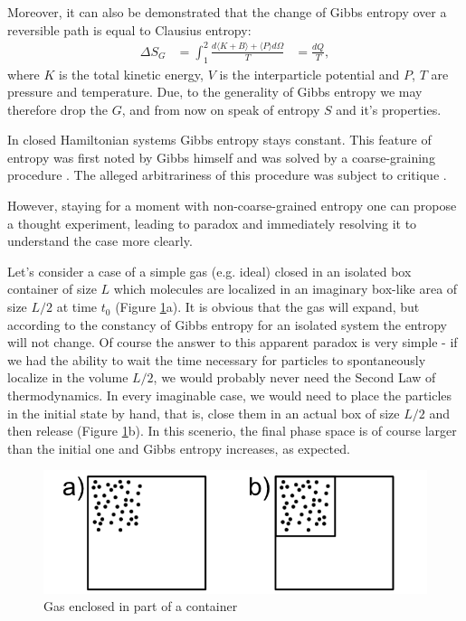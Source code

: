 \documentclass[a4paper,12pt]{article}
\begin{document}
Moreover, it can also be demonstrated \cite{Jaynes:1965gg} that the change of Gibbs entropy over a reversible path is equal to Clausius entropy:
\begin{equation}
\begin{aligned}
  \Delta S_G &= \int_1^2 \frac{d\langle K+ B \rangle+ \langle P \rangle d\Omega}{T}
  &= \frac{dQ}{T},
\end{aligned}
\end{equation}
where $K$ is the total kinetic energy, $V$ is the interparticle potential and $P$, $T$ are pressure and temperature. 
Due, to the generality of Gibbs entropy we may therefore drop the $G$, and from now on speak of entropy $S$ and it's properties.

In closed Hamiltonian systems Gibbs entropy stays constant.
This feature of entropy was first noted by Gibbs himself and was solved by a coarse-graining procedure \cite{Gibbs:1928tw}. The alleged arbitrariness of this procedure was subject to critique \cite{Evans:2241458}. %

However, staying for a moment with non-coarse-grained entropy one can propose a thought experiment, leading to paradox and immediately resolving it to understand the case more clearly. 

Let's consider a case of a simple gas (e.g. ideal) closed in an isolated box container of size $L$ which molecules are localized in an imaginary box-like area of size $L/2$ at time $t_0$ (Figure \ref{Fig1}a).
It is obvious that the gas will expand, but according to the constancy of Gibbs entropy for an isolated system the entropy will not change. Of course the answer to this apparent paradox is very simple - if we had the ability to wait the time necessary for particles to spontaneously localize in the volume $L/2$, we would probably never need the Second Law of thermodynamics. In every imaginable case, we  would need to place the particles in the initial state by hand, that is, close them in an actual box of size $L/2$ and then release (Figure \ref{Fig1}b). 
In this scenerio, the final phase space is of course larger than the initial one and Gibbs entropy increases, as expected.

\begin{figure}[ht!]
\centering \includegraphics[width=12cm]{Figure1} \caption{Gas enclosed in part of a container}
\label{Fig1} 
\end{figure}
\end{document}
